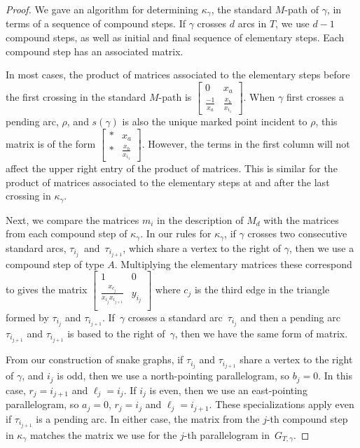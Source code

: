 \documentclass[11pt]{article}
\numberwithin{equation}{section}
\begin{document}
\begin{proof}
We gave an algorithm for determining $\kappa_\gamma$, the standard $M$-path of $\gamma$, in terms of a sequence of compound steps. If $\gamma$ crosses $d$ arcs in $T$, we use $d-1$ compound steps, as well as initial and final sequence of elementary steps. Each compound step has an associated matrix.

In most cases, the product of matrices associated to the elementary steps before the first crossing in the standard $M$-path is $\left[\begin{smallmatrix} 0 & x_a \\ \frac{-1}{x_a} & \frac{x_b}{x_{i_1}} \end{smallmatrix}\right]$. When $\gamma$ first crosses a pending arc, $\rho$, and $s(\gamma)$ is also the unique marked point incident to $\rho$, this matrix is of the form $\left[\begin{smallmatrix} * & x_a \\ * & \frac{x_b}{x_{i_1}} \end{smallmatrix}\right]$. However, the terms in the first column will not affect the upper right entry of the product of matrices. This is similar for the product of matrices associated to the elementary steps at and after the last crossing in $\kappa_\gamma$.

Next, we compare the matrices $m_i$ in the description of $M_d$ with the matrices from each compound step of $\kappa_\gamma$. In our rules for $\kappa_\gamma$, if $\gamma$ crosses two consecutive standard arcs, $\tau_{i_j}$~and~$\tau_{i_{j+1}}$, which share a vertex to the right of $\gamma$, then we use a compound step of type $A$. Multiplying the elementary matrices these correspond to gives the matrix $\left[\begin{smallmatrix} 1 & 0 \\ \frac{x_{c_j}}{x_{i_j}x_{i_{j+1}}} & y_{i_j} \\ \end{smallmatrix}\right]$ where $c_j$ is the third edge in the triangle formed by $\tau_{i_j}$ and $\tau_{i_{j+1}}$. If~$\gamma$ crosses a standard arc~$\tau_{i_j}$ and then a pending arc $\tau_{i_{j+1}}$ and $\tau_{i_{j+1}}$ is based to the right of~$\gamma$, then we have the same form of matrix.

From our construction of snake graphs, if $\tau_{i_j}$ and $\tau_{i_{j+1}}$ share a vertex to the right of $\gamma$, and $i_j$ is odd, then we use a north-pointing parallelogram, so $b_j = 0$. In this case, $r_j = i_{j+1}$ and $\ell_j = i_j$.
If $i_j$ is even, then we use an east-pointing parallelogram, so $a_j =0$, $r_j = i_j$ and $\ell_j = i_{j+1}$.
These specializations apply even if $\tau_{i_{j+1}}$ is a pending arc. In either case, the matrix from the $j$-th compound step in $\kappa_\gamma$ matches the matrix we use for the $j$-th parallelogram in~$G_{T,\gamma}$.


\end{proof}
\end{document}
